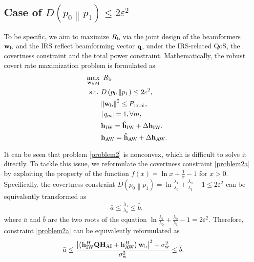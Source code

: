 \documentclass[10pt,journal,letterpaper,twocolumn,twoside]{IEEEtran} %
\begin{document}
\subsection{ Case of $D\left( {{p_0}\left\| {{p_1}} \right.} \right) \le 2{\varepsilon ^2}$}


To be specific, we aim to maximize ${R_{\rm{b}}}$ via the joint design of the beamformers  ${{\bf{w}}_{\rm{b}}}$ and the IRS reflect beamforming vector ${\bf{q}}$, under the IRS-related QoS, the covertness constraint and the total power constraint.
 Mathematically,  the robust covert rate maximization problem  is formulated as
\begin{subequations}\label{problem2}
\begin{align}
\mathop {\max }\limits_{{{\bf{w}}_{\rm{b}}},{\bf{q}}} {\rm{ }}&~{R_{\rm{b}}} \hfill \\
  {\text{s}}{\text{.t}}{\text{.}}~&D\left( {{p_0}\left\| {{p_1}} \right.} \right) \le 2{\varepsilon ^2}, \hfill \label{problem2a}\\
 & {\left\| {{{\mathbf{w}}_{\rm{b}}}} \right\|^2} \le  {P_{{\rm{total}}}}, \hfill \label{problem2b}\\
 &\left| {{q_m}} \right| = 1,\forall m,\label{problem2c}\\
&{{\bf{h}}_{\rm{IW}}} = {{{\bf{\hat h}}}_{\rm{IW}}} + \Delta {{\bf{h}}_{\rm{IW}}},\label{problem2d}\\
 &{{\bf{h}}_{\rm{AW}}} = {{{\bf{\hat h}}}_{\rm{AW}}} + \Delta {{\bf{h}}_{\rm{AW}}}.\label{problem2e}
\end{align}
\end{subequations}


It can be seen that  problem \eqref{problem2} is nonconvex, which is difficult
to solve it directly.
To tackle
this issue, we reformulate the  covertness constraint \eqref{problem2a} by exploiting the property  of the function $f\left( x \right) = \ln x + \frac{1}{x} - 1$ for $x > 0$.
Specifically,    the covertness constraint $D\left( {{p_0}\left\| {{p_1}} \right.} \right) = \ln \frac{{{\lambda _1}}}{{{\lambda _0}}} + \frac{{{\lambda _0}}}{{{\lambda _1}}} - 1 \le 2{\varepsilon ^2}$ can be  equivalently transformed as
 \begin{align}
\bar a \le \frac{{{\lambda _1}}}{{{\lambda _0}}} \le \bar b\label{barab},
 \end{align}
where    $\bar a$ and $\bar b$ are the two roots of the equation $\ln \frac{{{\lambda _1}}}{{{\lambda _0}}} + \frac{{{\lambda _0}}}{{{\lambda _1}}} - 1 = 2{\varepsilon ^2}$.
Therefore, constraint \eqref{problem2a} can   be equivalently reformulated as
\begin{align}
&\bar a \le \frac{{{\left| {\left( {{\bf{h}}_{{\rm{IW}}}^H{\bf{Q}}{{\bf{H}}_{{\rm{AI}}}} + {\bf{h}}_{{\rm{AW}}}^H} \right){{\bf{w}}_{\rm{b}}}} \right|^{\rm{2}}} + \sigma _{\rm{w}}^2}}{{\sigma _{\rm{w}}^2}} \le \bar b.\label{C_39}
 \end{align}
%
%
\end{document}
